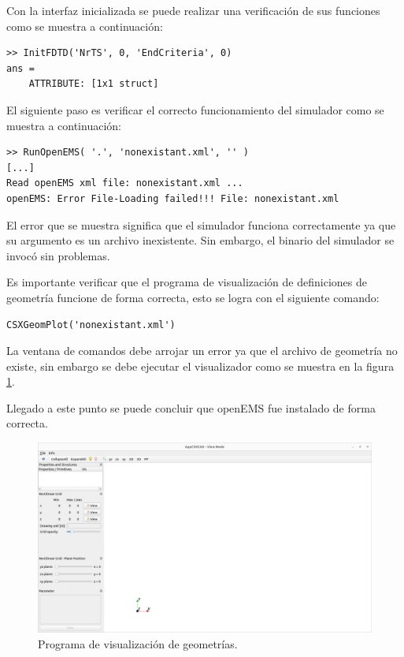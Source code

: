 \documentclass[
    11pt,
    spanish,
    a4paper
]{article}
\begin{document}
Con la interfaz inicializada se puede realizar una verificación de sus funciones
como se muestra a continuación:

\begin{verbatim}
>> InitFDTD('NrTS', 0, 'EndCriteria', 0)
ans = 
    ATTRIBUTE: [1x1 struct]
\end{verbatim}

El siguiente paso es verificar el correcto funcionamiento del simulador como se
muestra a continuación:

\begin{verbatim}
>> RunOpenEMS( '.', 'nonexistant.xml', '' )
[...]
Read openEMS xml file: nonexistant.xml ...
openEMS: Error File-Loading failed!!! File: nonexistant.xml
\end{verbatim}

El error que se muestra significa que el simulador funciona correctamente ya que
su argumento es un archivo inexistente. Sin embargo, el binario del simulador se
invocó sin problemas.

Es importante verificar que el programa de visualización de definiciones de
geometría funcione de forma correcta, esto se logra con el siguiente comando:

\begin{verbatim}
CSXGeomPlot('nonexistant.xml')
\end{verbatim}

La ventana de comandos debe arrojar un error ya que el archivo de geometría no
existe, sin embargo se debe ejecutar el visualizador como se muestra en la
figura \ref{fig:geovisual}.

Llegado a este punto se puede concluir que openEMS fue instalado de forma correcta.

\begin{figure}[htbp]
	\centering
	\includegraphics[width=\textwidth]{./img/geovisual.png}
	\caption{Programa de visualización de geometrías.}
	\label{fig:geovisual}
\end{figure}
\end{document}
